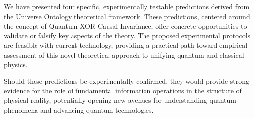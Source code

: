 We have presented four specific, experimentally testable predictions derived from the Universe Ontology theoretical framework. These predictions, centered around the concept of Quantum XOR Causal Invariance, offer concrete opportunities to validate or falsify key aspects of the theory. The proposed experimental protocols are feasible with current technology, providing a practical path toward empirical assessment of this novel theoretical approach to unifying quantum and classical physics.

Should these predictions be experimentally confirmed, they would provide strong evidence for the role of fundamental information operations in the structure of physical reality, potentially opening new avenues for understanding quantum phenomena and advancing quantum technologies. 